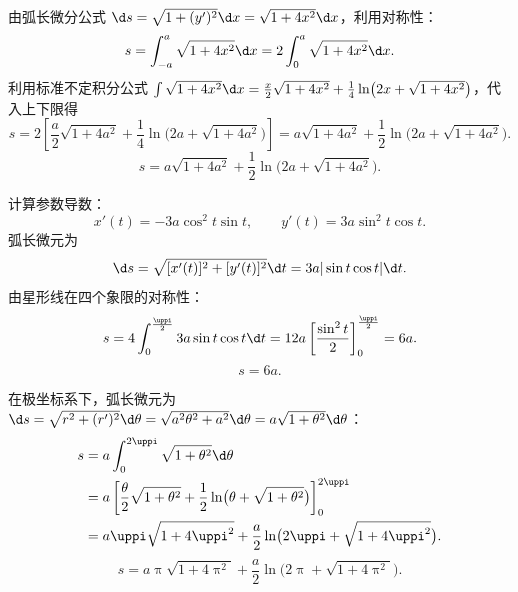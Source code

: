 \begin{solution}

    由弧长微分公式 $\d s = \sqrt{1 + (y')^2}\d x = \sqrt{1 + 4x^2}\d x$，利用对称性：
    \begin{equation}
        s = \int_{-a}^a \sqrt{1 + 4x^2}\d x = 2\int_0^a \sqrt{1 + 4x^2}\d x.
    \end{equation}
    利用标准不定积分公式 $\int \sqrt{1 + 4x^2}\d x = \frac{x}{2}\sqrt{1 + 4x^2} + \frac{1}{4}\ln\bigl(2x + \sqrt{1 + 4x^2}\bigr)$，代入上下限得
    \begin{equation}
        s = 2\left[ \frac{a}{2}\sqrt{1 + 4a^2} + \frac{1}{4}\ln\bigl(2a + \sqrt{1 + 4a^2}\bigr) \right] = a\sqrt{1 + 4a^2} + \frac{1}{2}\ln\bigl(2a + \sqrt{1 + 4a^2}\bigr).
    \end{equation}
    \begin{equation}
        \boxed{s = a\sqrt{1 + 4a^2} + \frac{1}{2}\ln\bigl(2a + \sqrt{1 + 4a^2}\bigr).}
    \end{equation}


    计算参数导数：
    \begin{equation}
        x'(t) = -3a\cos^2 t \sin t, \qquad y'(t) = 3a\sin^2 t \cos t.
    \end{equation}
    弧长微元为
    \begin{equation}
        \d s = \sqrt{[x'(t)]^2 + [y'(t)]^2}\d t = 3a|\sin t \cos t|\d t.
    \end{equation}
    由星形线在四个象限的对称性：
    \begin{equation}
        s = 4 \int_0^{\frac{\uppi}{2}} 3a\sin t \cos t \d t = 12a \left[ \frac{\sin^2 t}{2} \right]_0^{\frac{\uppi}{2}} = 6a.
    \end{equation}
    \begin{equation}
        \boxed{s = 6a.}
    \end{equation}


    在极坐标系下，弧长微元为 $\d s = \sqrt{r^2 + (r')^2}\d\theta = \sqrt{a^2\theta^2 + a^2}\d\theta = a\sqrt{1 + \theta^2}\d\theta$：
    \begin{equation}
        \begin{aligned}
            s & = a \int_0^{2\uppi} \sqrt{1 + \theta^2}\d\theta                                                                            \\
              & = a \left[ \frac{\theta}{2}\sqrt{1 + \theta^2} + \frac{1}{2}\ln\bigl(\theta + \sqrt{1 + \theta^2}\bigr) \right]_0^{2\uppi} \\
              & = a\uppi\sqrt{1 + 4\uppi^2} + \frac{a}{2}\ln\bigl(2\uppi + \sqrt{1 + 4\uppi^2}\bigr).
        \end{aligned}
    \end{equation}
    \begin{equation}
        \boxed{s = a\uppi\sqrt{1 + 4\uppi^2} + \frac{a}{2}\ln\bigl(2\uppi + \sqrt{1 + 4\uppi^2}\bigr).}
    \end{equation}
\end{solution}

